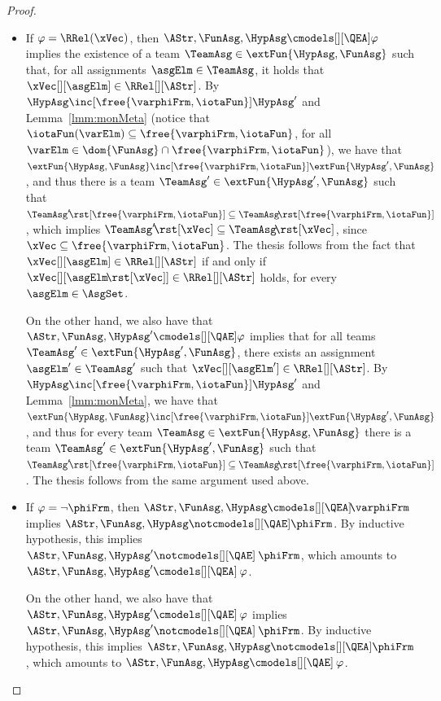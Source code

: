 \documentclass[authoryear]{elsarticle}
\begin{document}
\begin{proof}
\begin{itemize}
  \item If $\varphi = \RRel(\xVec)$, then $\AStr, \FunAsg, \HypAsg
    \cmodels[][\QEA] \varphi$ implies the existence of a team $\TeamAsg \in
    \extFun{\HypAsg, \FunAsg}$ such that, for all assignments $\asgElm \in
    \TeamAsg$, it holds that $\xVec[][\asgElm] \in \RRel[][\AStr]$.
    By $\HypAsg \inc[\free{\varphiFrm,\iotaFun}] \HypAsg'$ and
    Lemma~\ref{lmm:monMeta} (notice that $\iotaFun(\varElm) \subseteq
    \free{\varphiFrm,\iotaFun}$, for all $\varElm \in \dom{\FunAsg} \cap
    \free{\varphiFrm,\iotaFun}$), we have that $\extFun{\HypAsg, \FunAsg}
    \inc[\free{\varphiFrm,\iotaFun}] \extFun{\HypAsg', \FunAsg}$, and thus there
    is a team $\TeamAsg' \in \extFun{\HypAsg', \FunAsg}$ such that $\TeamAsg'
    \!\rst[\free{\varphiFrm,\iotaFun}] \subseteq \TeamAsg
    \!\rst[\free{\varphiFrm,\iotaFun}]$, which implies $\TeamAsg' \!\rst[\xVec]
    \subseteq \TeamAsg \!\rst[\xVec]$, since $\xVec \subseteq
    \free{\varphiFrm,\iotaFun}$.
    The thesis follows from the fact that $\xVec[][\asgElm] \in \RRel[][\AStr]$
    if and only if $\xVec[][{\asgElm \!\rst[\xVec]}] \in \RRel[][\AStr]$ holds,
    for every $\asgElm \in \AsgSet$.

    On the other hand, we also have that $\AStr, \FunAsg, \HypAsg'
    \cmodels[][\QAE] \varphi$ implies that for all teams $\TeamAsg' \in
    \extFun{\HypAsg', \FunAsg}$, there exists an assignment $\asgElm' \in
    \TeamAsg'$ such that $\xVec[][\asgElm'] \in \RRel[][\AStr]$.
    By $\HypAsg \inc[\free{\varphiFrm,\iotaFun}] \HypAsg'$ and
    Lemma~\ref{lmm:monMeta}, we have that $\extFun{\HypAsg, \FunAsg}
    \inc[\free{\varphiFrm,\iotaFun}] \extFun{\HypAsg', \FunAsg}$, and thus for
    every team $\TeamAsg \in \extFun{\HypAsg, \FunAsg}$ there is a team
    $\TeamAsg' \in \extFun{\HypAsg',
      \FunAsg}$ such that $\TeamAsg' \!\rst[\free{\varphiFrm,\iotaFun}]
    \subseteq \TeamAsg \!\rst[\free{\varphiFrm,\iotaFun}]$.
    The thesis follows from the same argument used above.

  \item If $\varphi = \neg \phiFrm$, then $\AStr, \FunAsg, \HypAsg
    \cmodels[][\QEA]\! \varphiFrm$ implies $\AStr, \FunAsg, \HypAsg
    \notcmodels[][\QAE] \phiFrm$.
    By inductive hypothesis, this implies $\AStr, \FunAsg, \HypAsg'
    \notcmodels[][\QAE]\: \phiFrm$, which amounts to $\AStr, \FunAsg, \HypAsg'
    \cmodels[][\QEA]\: \varphi$.

    On the other hand, we also have that $\AStr, \FunAsg, \HypAsg'
    \cmodels[][\QAE]\: \varphi$ implies $\AStr, \FunAsg, \HypAsg'
    \notcmodels[][\QEA]\: \phiFrm$.
    By inductive hypothesis, this implies $\AStr, \FunAsg, \HypAsg
    \notcmodels[][\QEA] \phiFrm$, which amounts to $\AStr, \FunAsg, \HypAsg
    \cmodels[][\QAE]\: \varphi$.


\end{itemize}
\end{proof}
\end{document}
